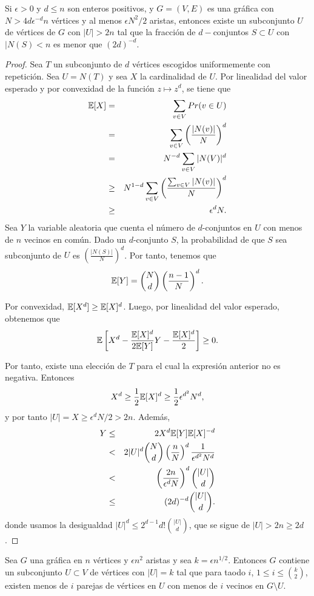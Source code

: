 \begin{theorem}
Si $\epsilon > 0$ y $d\leq n$ son enteros positivos, y $G = (V, E)$
es una gráfica con
$N > 4d\epsilon^{-d}n$ vértices y al menos $\epsilon N^2 / 2$
aristas, entonces existe un
subconjunto $U$ de vértices de $G$ con $\vert U \vert > 2n$ tal que
la fracción de $d-$conjuntos $S \subset U$ con $\vert N(S) < n$ es
menor que $(2d)^{-d}$.
\end{theorem}
\begin{proof}
Sea $T$ un subconjunto de $d$ vértices escogidos uniformemente con
repetición. Sea
$U = N(T)$ y sea $X$ la cardinalidad de $U$. Por linealidad del valor
esperado y por
convexidad de la función $z \mapsto z^d$, se tiene que
\begin{eqnarray*}
  \mathbb{E}[X] &=& \sum_{v \in V}Pr(v \in U)\\
  &=& \sum_{v \in V}\left(\frac{\vert N(v) \vert}{N}\right)^d\\
  &=& N^{-d}\sum_{v \in V} \vert N(V) \vert^d \\
  &\ge& N^{1-d}\sum_{v \in V} \left( \frac{\sum_{v \in V}\vert
  N(v)\vert}{N} \right)^d\\
  &\ge& \epsilon^dN.
\end{eqnarray*}
Sea $Y$ la variable aleatoria que cuenta el número de $d$-conjuntos
en $U$ con menos de
$n$ vecinos en común. Dado un $d$-conjunto $S$, la probabilidad de
que $S$ sea subconjunto de $U$
es $\left(\frac{\vert N(S)\vert}{N} \right)^d$. Por tanto, tenemos que
$$\mathbb{E}[Y] = \binom{N}{d} \left( \frac{n-1}{N} \right)^d.$$

Por convexidad, $\mathbb{E}[X^d] \ge \mathbb{E}[X]^d$. Luego, por linealidad del
valor esperado, obtenemos que
$$\mathbb{E}\left[X^d - \frac{\mathbb{E}[X]^d}{2 \mathbb{E}[Y]} Y - \frac{\mathbb{E}[X]^d}{2} \right] \ge 0.$$

Por tanto, existe una elección de $T$ para el cual la expresión
anterior no es negativa. Entonces
$$X^d \ge \frac{1}{2} \mathbb{E}[X]^d \ge \frac{1}{2}\epsilon^{d^2} N^d, $$
y por tanto $\vert U \vert = X \ge \epsilon^d N / 2 > 2n.$ Además,
\begin{eqnarray*}
  Y &\le& 2X^d\mathbb{E}[Y]\mathbb{E}[X]^{-d} \\
  &<& 2 \vert U \vert^d \binom{N}{d}\left( \frac{n}{N} \right)^d
  \frac{1}{\epsilon^{d^2} N^d}\\
  &<& \left( \frac{2n}{\epsilon^d N} \right)^d \binom{\vert U \vert}{d} \\
  &\le& (2d)^{-d} \binom{\vert U \vert}{d}.
\end{eqnarray*}
donde usamos la desigualdad $\vert U \vert^d \le 2^{d-1} d!
\binom{\vert U \vert}{d}$, que se sigue de $\vert U \vert > 2n \ge 2d$.
\end{proof}

\begin{theorem}
Sea $G$ una gráfica en $n$ vértices y $\epsilon n^2$ aristas y sea $k
= \epsilon n^{1/2}$. Entonces $G$ contiene un subconjunto $U \subset
V$  de vértices  con $\vert U \vert = k$ tal que para taodo $i$, $1
\leq i \leq \binom{k}{2}$, existen menos de $i$ parejas de vértices
en $U$ con menos de $i$ vecinos en $G \setminus U$.
\end{theorem}

